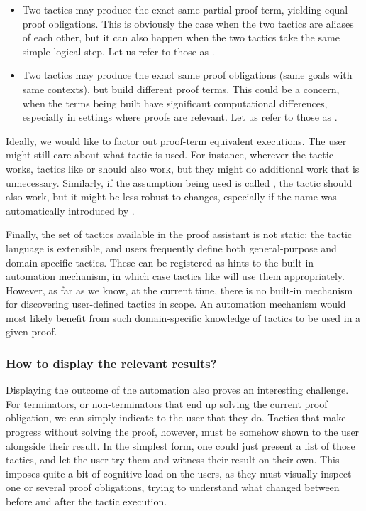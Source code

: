 \begin{itemize}

  \item Two tactics may produce the exact same partial proof term, yielding
equal proof obligations.  This is obviously the case when the two tactics are
aliases of each other, but it can also happen when the two tactics take the same
simple logical step.  Let us refer to those as .

  \item Two tactics may produce the exact same proof obligations (same goals
with same contexts), but build different proof terms.  This could be a concern,
when the terms being built have significant computational differences,
especially in settings where proofs are relevant.  Let us refer to those as
.

\end{itemize}

Ideally, we would like to factor out proof-term equivalent executions.  The user
might still care about what tactic is used.  For instance, wherever the
 tactic works, tactics like  or
 should also work, but they might do additional work that
is unnecessary.  Similarly, if the assumption being used is called
, the tactic  should also work, but it might be
less robust to changes, especially if the name  was
automatically introduced by \Coq{}.

Finally, the set of tactics available in the \Coq{} proof assistant is not
static: the tactic language is extensible, and users frequently define both
general-purpose and domain-specific tactics.  These can be registered as hints
to the built-in automation mechanism, in which case tactics like
 will use them appropriately.  However, as far as we know, at
the current time, there is no built-in mechanism for discovering user-defined
tactics in scope.  An automation mechanism would most likely benefit from such
domain-specific knowledge of tactics to be used in a given proof.

\subsubsection{How to display the relevant results?}

Displaying the outcome of the automation also proves an interesting challenge.
For terminators, or non-terminators that end up solving the current proof
obligation, we can simply indicate to the user that they do.  Tactics that make
progress without solving the proof, however, must be somehow shown to the user
alongside their result.  In the simplest form, one could just present a list of
those tactics, and let the user try them and witness their result on their own.
This imposes quite a bit of cognitive load on the users, as they must visually
inspect one or several proof obligations, trying to understand what changed
between before and after the tactic execution.

